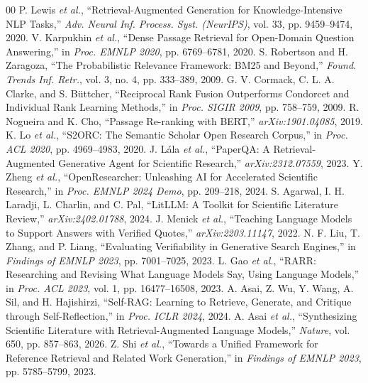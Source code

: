 \documentclass[conference]{IEEEtran}
\begin{document}
\begin{thebibliography}{00}
 P. Lewis \textit{et al.}, ``Retrieval-Augmented Generation for Knowledge-Intensive NLP Tasks,'' \textit{Adv. Neural Inf. Process. Syst. (NeurIPS)}, vol. 33, pp. 9459--9474, 2020.
 V. Karpukhin \textit{et al.}, ``Dense Passage Retrieval for Open-Domain Question Answering,'' in \textit{Proc. EMNLP 2020}, pp. 6769--6781, 2020.
 S. Robertson and H. Zaragoza, ``The Probabilistic Relevance Framework: BM25 and Beyond,'' \textit{Found. Trends Inf. Retr.}, vol. 3, no. 4, pp. 333--389, 2009.
 G. V. Cormack, C. L. A. Clarke, and S. B{\"u}ttcher, ``Reciprocal Rank Fusion Outperforms Condorcet and Individual Rank Learning Methods,'' in \textit{Proc. SIGIR 2009}, pp. 758--759, 2009.
 R. Nogueira and K. Cho, ``Passage Re-ranking with BERT,'' \textit{arXiv:1901.04085}, 2019.
 K. Lo \textit{et al.}, ``S2ORC: The Semantic Scholar Open Research Corpus,'' in \textit{Proc. ACL 2020}, pp. 4969--4983, 2020.
 J. L{\'a}la \textit{et al.}, ``PaperQA: A Retrieval-Augmented Generative Agent for Scientific Research,'' \textit{arXiv:2312.07559}, 2023.
 Y. Zheng \textit{et al.}, ``OpenResearcher: Unleashing AI for Accelerated Scientific Research,'' in \textit{Proc. EMNLP 2024 Demo}, pp. 209--218, 2024.
 S. Agarwal, I. H. Laradji, L. Charlin, and C. Pal, ``LitLLM: A Toolkit for Scientific Literature Review,'' \textit{arXiv:2402.01788}, 2024.
 J. Menick \textit{et al.}, ``Teaching Language Models to Support Answers with Verified Quotes,'' \textit{arXiv:2203.11147}, 2022.
 N. F. Liu, T. Zhang, and P. Liang, ``Evaluating Verifiability in Generative Search Engines,'' in \textit{Findings of EMNLP 2023}, pp. 7001--7025, 2023.
 L. Gao \textit{et al.}, ``RARR: Researching and Revising What Language Models Say, Using Language Models,'' in \textit{Proc. ACL 2023}, vol. 1, pp. 16477--16508, 2023.
 A. Asai, Z. Wu, Y. Wang, A. Sil, and H. Hajishirzi, ``Self-RAG: Learning to Retrieve, Generate, and Critique through Self-Reflection,'' in \textit{Proc. ICLR 2024}, 2024.
 A. Asai \textit{et al.}, ``Synthesizing Scientific Literature with Retrieval-Augmented Language Models,'' \textit{Nature}, vol. 650, pp. 857--863, 2026.
 Z. Shi \textit{et al.}, ``Towards a Unified Framework for Reference Retrieval and Related Work Generation,'' in \textit{Findings of EMNLP 2023}, pp. 5785--5799, 2023.

\end{thebibliography}
\end{document}
